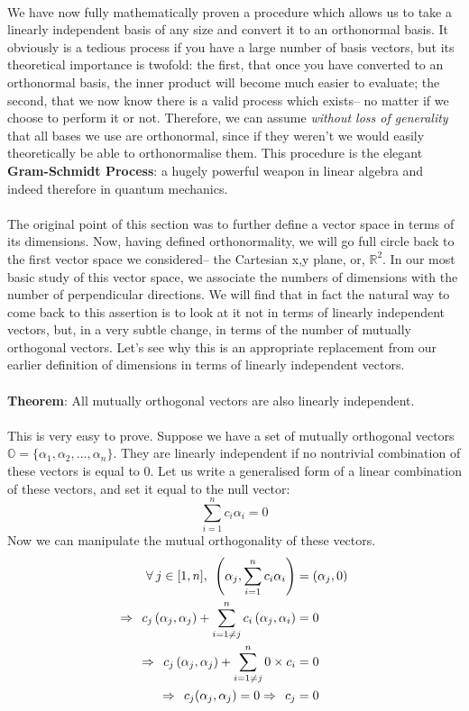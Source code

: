 \\
We have now fully mathematically proven a procedure which allows us to take a linearly independent basis of any size and convert it to an orthonormal basis. It obviously is a tedious process if you have a large number of basis vectors, but its theoretical importance is twofold: the first, that once you have converted to an orthonormal basis, the inner product will become much easier to evaluate; the second, that we now know there is a valid process which exists-- no matter if we choose to perform it or not. Therefore, we can assume \textit{without loss of generality} that all bases we use are orthonormal, since if they weren't we would easily theoretically be able to orthonormalise them. This procedure is the elegant \textbf{Gram-Schmidt Process}: a hugely powerful weapon in linear algebra and indeed therefore in quantum mechanics.
\\\\
The original point of this section was to further define a vector space in terms of its dimensions. Now, having defined orthonormality, we will go full circle back to the first vector space we considered-- the Cartesian x,y plane, or, $\mathbb{R}^2$. In our most basic study of this vector space, we associate the numbers of dimensions with the number of perpendicular directions. We will find that in fact the natural way to come back to this assertion is to look at it not in terms of linearly independent vectors, but, in a very subtle change, in terms of the number of mutually orthogonal vectors. Let's see why this is an appropriate replacement from our earlier definition of dimensions in terms of linearly independent vectors.
\\\\
\textbf{Theorem}: All mutually orthogonal vectors are also linearly independent.
\\\\
This is very easy to prove. Suppose we have a set of mutually orthogonal vectors $\mathbb{O}=\{\alpha_{1}, \alpha_{2}, ..., \alpha_{n}\}$. They are linearly independent if no nontrivial combination of these vectors is equal to $0$. Let us write a generalised form of a linear combination of these vectors, and set it equal to the null vector:
$$
\sum_{i=1}^{n}c_{i}\alpha_{i}=0
$$
Now we can manipulate the mutual orthogonality of these vectors. 
$$
\begin{aligned}
\forall\: j \in [1,n], \:\: \left(\alpha_{j},\sum_{i=1}^{n}c_{i}\alpha_{i}\right) &=\left(\alpha_{j},0\right) \\ 
\Rightarrow\:\:  c_{j}\left(\alpha_{j},\alpha_{j}\right)+\sum_{i=1\neq j}^{n}c_{i}\left(\alpha_{j},\alpha_{i}\right) &= 0 \\
\Rightarrow\:\: c_{j}\left(\alpha_{j},\alpha_{j}\right)+\sum_{i=1\neq j}^{n}0\times c_{i} &= 0 \\ 
\Rightarrow\:\:  c_{j}(\alpha_{j},\alpha_{j})= 0 \Rightarrow\:\:c_{j} &= 0
\end{aligned}
$$

